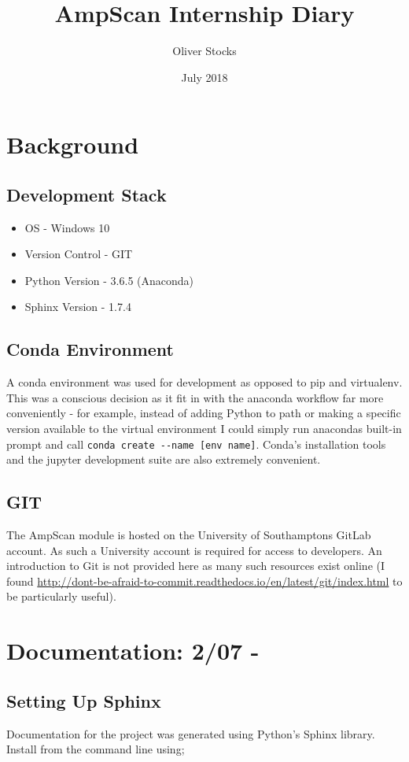 \documentclass{article}
\title{AmpScan Internship Diary}
\author{Oliver Stocks}
\date{July 2018}
\begin{document}
\maketitle

\section{Background}
\subsection{Development Stack}
\begin{itemize}
    \item
    OS - Windows 10
    \item
    Version Control - GIT
    \item
    Python Version - 3.6.5 (Anaconda)
    \item
    Sphinx Version - 1.7.4
\end{itemize}

\subsection{Conda Environment}
A conda environment was used for development as opposed to pip and virtualenv. This was a conscious decision as it fit in with the anaconda workflow far more conveniently - for example, instead of adding Python to path or making a specific version available to the virtual environment I could simply run anacondas built-in prompt and call \lstinline{conda create --name [env name]}. Conda's installation tools and the jupyter development suite are also extremely convenient.

 \subsection{GIT}
The AmpScan module is hosted on the University of Southamptons GitLab account. As such a University account is required for access to developers. An introduction to Git is not provided here as many such resources exist online (I found \url{http://dont-be-afraid-to-commit.readthedocs.io/en/latest/git/index.html} to be particularly useful).

\section{Documentation: 2/07 - }

\subsection{Setting Up Sphinx}
Documentation for the project was generated using Python's Sphinx library. Install from the command line using;
\end{document}
